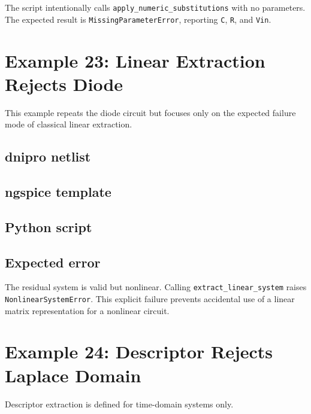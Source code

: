 \documentclass[11pt,a4paper]{article}
\newcommand{\code}[1]{\texttt{#1}}
\begin{document}
The script intentionally calls \code{apply\_numeric\_substitutions} with no
parameters. The expected result is \code{MissingParameterError}, reporting
\code{C}, \code{R}, and \code{Vin}.

\section{Example 23: Linear Extraction Rejects Diode}
\label{sec:ex-linear-rejects-diode}

This example repeats the diode circuit but focuses only on the expected failure
mode of classical linear extraction.

\subsection{dnipro netlist}



\subsection{ngspice template}



\subsection{Python script}



\subsection{Expected error}

The residual system is valid but nonlinear. Calling
\code{extract\_linear\_system} raises \code{NonlinearSystemError}. This explicit
failure prevents accidental use of a linear matrix representation for a
nonlinear circuit.

\section{Example 24: Descriptor Rejects Laplace Domain}
\label{sec:ex-descriptor-rejects-laplace}

Descriptor extraction is defined for time-domain systems only.
\end{document}
